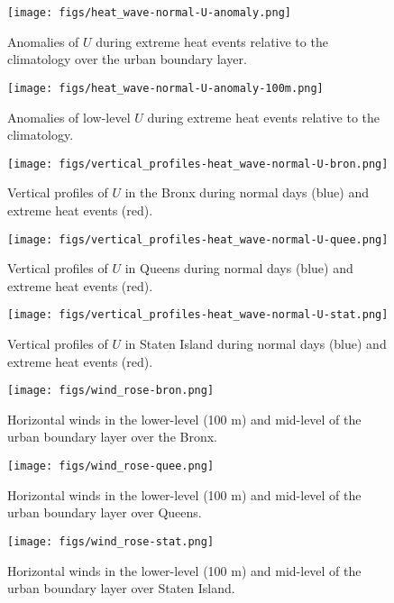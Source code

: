 \documentclass[11pt,a4paper]{article}
\begin{document}
\begin{figure}[ht]
	\centering
	\texttt{[image: figs/heat\_wave-normal-U-anomaly.png]}
	\caption{Anomalies of $U$ during extreme heat events relative to the climatology over the urban boundary layer.}
	\label{fig:extreme-heat-normal-comparison-contours-U}
\end{figure}
\begin{figure}[ht]
	\centering
	\texttt{[image: figs/heat\_wave-normal-U-anomaly-100m.png]}
	\caption{Anomalies of low-level $U$ during extreme heat events relative to the climatology.}
	\label{fig:extreme-heat-normal-100m-comparison-U}
\end{figure}
\begin{figure}[ht]
	\centering
	\texttt{[image: figs/vertical\_profiles-heat\_wave-normal-U-bron.png]}
	\caption{Vertical profiles of $U$ in the Bronx during normal days (blue) and extreme heat events (red).}
	\label{fig:vertical_profiles-heat_wave-normal-U-bron}
\end{figure}
\begin{figure}[ht]
	\centering
	\texttt{[image: figs/vertical\_profiles-heat\_wave-normal-U-quee.png]}
	\caption{Vertical profiles of $U$ in Queens during normal days (blue) and extreme heat events (red).}
	\label{fig:vertical_profiles-heat_wave-normal-U-quee}
\end{figure}
\begin{figure}[ht]
	\centering
	\texttt{[image: figs/vertical\_profiles-heat\_wave-normal-U-stat.png]}
	\caption{Vertical profiles of $U$ in Staten Island during normal days (blue) and extreme heat events (red).}
	\label{fig:vertical_profiles-heat_wave-normal-U-stat}
\end{figure}

\begin{figure}[ht]
	\centering
	\texttt{[image: figs/wind\_rose-bron.png]}
	\caption{Horizontal winds in the lower-level (100 m) and mid-level of the urban boundary layer over the Bronx.}
	\label{fig:wind_rose-bron}
\end{figure}
\begin{figure}[ht]
	\centering
	\texttt{[image: figs/wind\_rose-quee.png]}
	\caption{Horizontal winds in the lower-level (100 m) and mid-level of the urban boundary layer over Queens.}
	\label{fig:wind_rose-quee}
\end{figure}
\begin{figure}[ht]
	\centering
	\texttt{[image: figs/wind\_rose-stat.png]}
	\caption{Horizontal winds in the lower-level (100 m) and mid-level of the urban boundary layer over Staten Island.}
	\label{fig:wind_rose-stat}
\end{figure}
\end{document}
